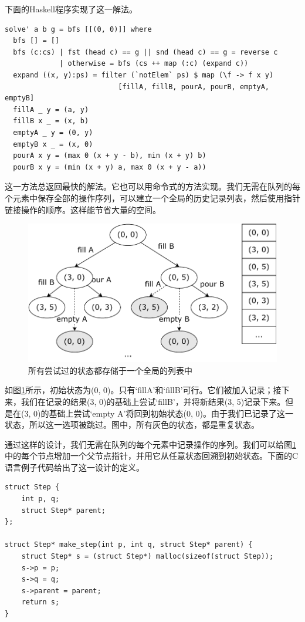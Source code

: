 \documentclass[b5paper]{ctexart}
\begin{document}
下面的Haskell程序实现了这一解法。

\begin{lstlisting}[style=Haskell]
solve' a b g = bfs [[(0, 0)]] where
  bfs [] = []
  bfs (c:cs) | fst (head c) == g || snd (head c) == g = reverse c
             | otherwise = bfs (cs ++ map (:c) (expand c))
  expand ((x, y):ps) = filter (`notElem` ps) $ map (\f -> f x y)
                           [fillA, fillB, pourA, pourB, emptyA, emptyB]
  fillA _ y = (a, y)
  fillB x _ = (x, b)
  emptyA _ y = (0, y)
  emptyB x _ = (x, 0)
  pourA x y = (max 0 (x + y - b), min (x + y) b)
  pourB x y = (min (x + y) a, max 0 (x + y - a))
\end{lstlisting} %

这一方法总返回最快的解法。它也可以用命令式的方法实现。我们无需在队列的每个元素中保存全部的操作序列，可以建立一个全局的历史记录列表，然后使用指针链接操作的顺序。这样能节省大量的空间。

\begin{figure}[htbp]
  \centering
  \includegraphics[scale=0.5]{img/water-jugs}
  \caption{所有尝试过的状态都存储于一个全局的列表中}
  \label{fig:water-jugs}
\end{figure}

如图\ref{fig:water-jugs}所示，初始状态为(0, 0)。只有`fillA'和`fillB'可行。它们被加入记录；接下来，我们在记录的结果(3, 0)的基础上尝试`fillB'，并将新结果(3, 5)记录下来。但是在(3, 0)的基础上尝试`empty A'将回到初始状态(0, 0)。由于我们已记录了这一状态，所以这一选项被跳过。图中，所有灰色的状态，都是重复状态。

通过这样的设计，我们无需在队列的每个元素中记录操作的序列。我们可以给图\ref{fig:water-jugs}中的每个节点增加一个父节点指针，并用它从任意状态回溯到初始状态。下面的C语言例子代码给出了这一设计的定义。

\lstset{language=C}
\begin{lstlisting}
struct Step {
    int p, q;
    struct Step* parent;
};

struct Step* make_step(int p, int q, struct Step* parent) {
    struct Step* s = (struct Step*) malloc(sizeof(struct Step));
    s->p = p;
    s->q = q;
    s->parent = parent;
    return s;
}
\end{lstlisting}
\end{document}
